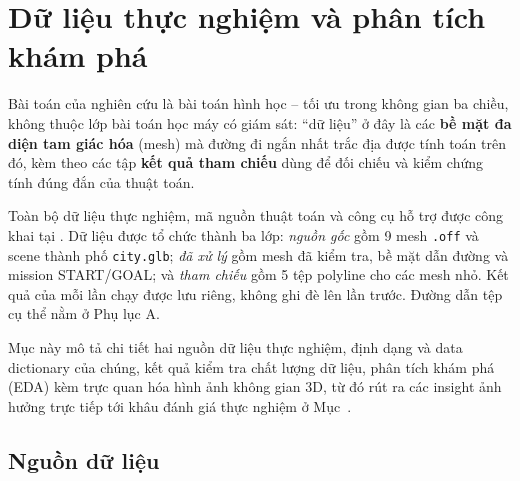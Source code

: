 
\section{Dữ liệu thực nghiệm và phân tích khám phá}\label{sec:data}

Bài toán của nghiên cứu là bài toán hình học -- tối ưu trong không gian ba chiều,
không thuộc lớp bài toán học máy có giám sát: ``dữ liệu'' ở đây là các \textbf{bề
mặt đa diện tam giác hóa} (mesh) mà đường đi ngắn nhất trắc địa được tính toán
trên đó, kèm theo các tập \textbf{kết quả tham chiếu} dùng để đối chiếu và kiểm
chứng tính đúng đắn của thuật toán.

Toàn bộ dữ liệu thực nghiệm, mã nguồn thuật toán và công cụ hỗ trợ được công khai
tại \cite{kien2026repo}. Dữ liệu được tổ chức thành ba lớp: \emph{nguồn gốc} gồm
9 mesh \texttt{.off} và scene thành phố \texttt{city.glb}; \emph{đã xử lý} gồm
mesh đã kiểm tra, bề mặt dẫn đường và mission START/GOAL; và \emph{tham chiếu} gồm
5 tệp polyline cho các mesh nhỏ. Kết quả của mỗi lần chạy được lưu riêng, không
ghi đè lên lần trước. Đường dẫn tệp cụ thể nằm ở Phụ lục A.

Mục này mô tả chi tiết hai nguồn dữ liệu thực nghiệm, định dạng và data dictionary
của chúng, kết quả kiểm tra chất lượng dữ liệu, phân tích khám phá (EDA) kèm trực
quan hóa hình ảnh không gian 3D, từ đó rút ra các insight ảnh hưởng trực tiếp tới
khâu đánh giá thực nghiệm ở Mục~.

\subsection{Nguồn dữ liệu}

